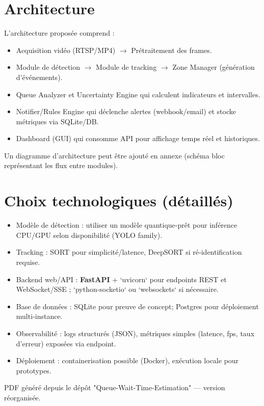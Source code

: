 \documentclass[11pt,a4paper]{article}
\begin{document}
\clearpage
\section{Architecture}
L'architecture proposée comprend :
\begin{itemize}
  \item Acquisition vidéo (RTSP/MP4) $\rightarrow$ Prétraitement des frames.
  \item Module de détection $\rightarrow$ Module de tracking $\rightarrow$ Zone Manager (génération d'événements).
  \item Queue Analyzer et Uncertainty Engine qui calculent indicateurs et intervalles.
  \item Notifier/Rules Engine qui déclenche alertes (webhook/email) et stocke métriques via SQLite/DB.
  \item Dashboard (GUI) qui consomme API pour affichage temps réel et historiques.
\end{itemize}

Un diagramme d'architecture peut être ajouté en annexe (schéma bloc représentant les flux entre modules).

\section{Choix technologiques (détaillés)}
\begin{itemize}
  \item Modèle de détection : utiliser un modèle quantique‑prêt pour inférence CPU/GPU selon disponibilité (YOLO family).
  \item Tracking : SORT pour simplicité/latence, DeepSORT si ré‑identification requise.
  \item Backend web/API : \textbf{FastAPI} + `uvicorn` pour endpoints REST et WebSocket/SSE ; `python-socketio` ou `websockets` si nécessaire.
  \item Base de données : SQLite pour preuve de concept; Postgres pour déploiement multi‑instance.
  \item Observabilité : logs structurés (JSON), métriques simples (latence, fps, taux d'erreur) exposées via endpoint.
  \item Déploiement : containerisation possible (Docker), exécution locale pour prototypes.
\end{itemize}

\vfill
\noindent PDF généré depuis le dépôt "Queue-Wait-Time-Estimation" — version réorganisée.
\end{document}
